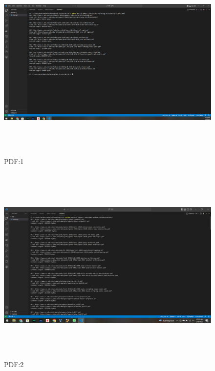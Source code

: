 \documentclass[12pt]{article}
\begin{document}
\begin{figure}[H]
    \centering
    \includegraphics[trim=0 0 0 0, clip, width=\textwidth,height=10cm] {Q3a.png}
    \caption{PDF:1}
    \label{fig:Q3a}
\end{figure}

\begin{figure}[h!]
    \centering
    \includegraphics[trim=0 0 0 0, clip, width=\textwidth,height=10cm] {Q3b.png}
    \caption{PDF:2}
    \label{fig:Q3b}
\end{figure}
\end{document}
